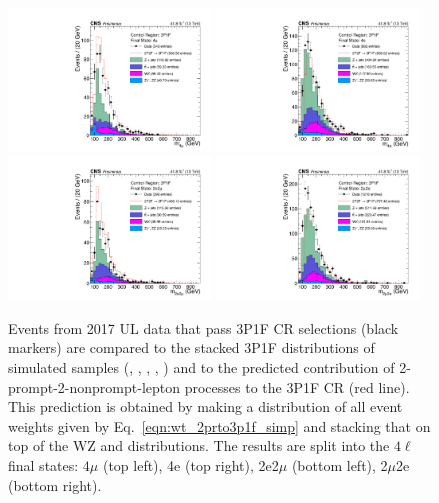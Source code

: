 \begin{figure}[!htbp]
	\begin{center}
		\includegraphics[width=0.48\textwidth]{figures/higgsmassmeas/redbkg/cr/UL2017_CR_3P1F_4mu.pdf}
		\includegraphics[width=0.48\textwidth]{figures/higgsmassmeas/redbkg/cr/UL2017_CR_3P1F_4e.pdf}
		\includegraphics[width=0.48\textwidth]{figures/higgsmassmeas/redbkg/cr/UL2017_CR_3P1F_2e2mu.pdf}
		\includegraphics[width=0.48\textwidth]{figures/higgsmassmeas/redbkg/cr/UL2017_CR_3P1F_2mu2e.pdf}
		\caption{
			Events from 2017 UL data that pass 3P1F CR selections (black markers) 
			are compared to the stacked 3P1F distributions of simulated samples
			(\Zplusjets, \ttbarplusjets, \WZ, \Zgammastar, \ZZ)
			and to the predicted contribution of 2-prompt-2-nonprompt-lepton processes to the 3P1F CR (red line).
			This prediction is obtained by making a distribution of all event weights given by Eq.~\ref{eqn:wt_2prto3p1f_simp} and stacking that on top of the WZ and \ZZ distributions.
			The results are split into the $4\ell$ final states:
			$4\mu$ (top left), 4e (top right), 2e2$\mu$ (bottom left), 2$\mu$2e (bottom right).
		}
		\label{cr_plots_3p1f_2017}
	\end{center}
\end{figure}
